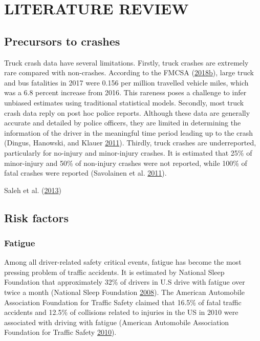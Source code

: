 \documentclass[12pt]{book}
\numberwithin{equation}{chapter}
\begin{document}
\hypertarget{literature-review}{%
\chapter{LITERATURE REVIEW}\label{literature-review}}

\hypertarget{precursors-to-crashes}{%
\section{Precursors to crashes}\label{precursors-to-crashes}}

Truck crash data have several limitations. Firstly, truck crashes are extremely rare compared with non-crashes. According to the FMCSA (\protect\hyperlink{ref-fmcsareport2017}{2018}\protect\hyperlink{ref-fmcsareport2017}{b}), large truck and bus fatalities in 2017 were 0.156 per million travelled vehicle miles, which was a 6.8 percent increase from 2016. This rareness poses a challenge to infer unbiased estimates using traditional statistical models. Secondly, most truck crash data reply on post hoc police reports. Although these data are generally accurate and detailed by police officers, they are limited in determining the information of the driver in the meaningful time period leading up to the crash (Dingus, Hanowski, and Klauer \protect\hyperlink{ref-dingus2011estimating}{2011}). Thirdly, truck crashes are underreported, particularly for no-injury and minor-injury crashes. It is estimated that 25\% of minor-injury and 50\% of non-injury crashes were not reported, while 100\% of fatal crashes were reported (Savolainen et al. \protect\hyperlink{ref-savolainen2011statistical}{2011}).

Saleh et al. (\protect\hyperlink{ref-saleh2013accident}{2013})

\hypertarget{risk-factors}{%
\section{Risk factors}\label{risk-factors}}

\hypertarget{fatigue}{%
\subsection{Fatigue}\label{fatigue}}

Among all driver-related safety critical events, fatigue has become the most pressing problem of traffic accidents. It is estimated by National Sleep Foundation that approximately 32\% of drivers in U.S drive with fatigue over twice a month (National Sleep Foundation \protect\hyperlink{ref-nsleepf}{2008}). The American Automobile Association Foundation for Traffic Safety claimed that 16.5\% of fatal traffic accidents and 12.5\% of collisions related to injuries in the US in 2010 were associated with driving with fatigue (American Automobile Association Foundation for Traffic Safety \protect\hyperlink{ref-aaafoundation}{2010}).
\end{document}
